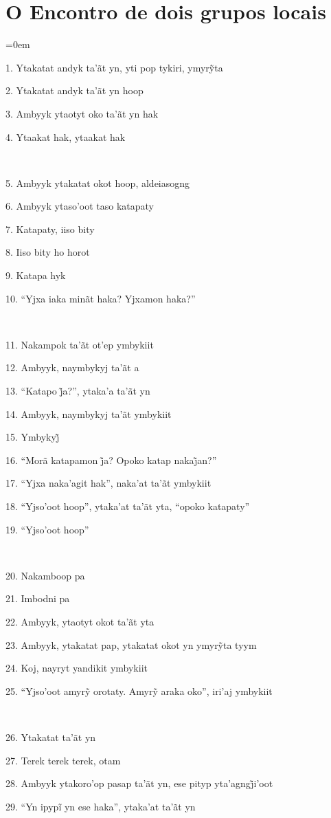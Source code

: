\chapter*{O Encontro de dois grupos locais}\parindent=0em

1. Ytakatat andyk ta’ãt yn, yti pop tykiri, ymyrỹta

2. Ytakatat andyk ta'ãt yn hoop

3. Ambyyk ytaotyt oko ta'ãt yn hak

4. Ytaakat hak, ytaakat hak

~

5. Ambyyk ytakatat okot hoop, aldeiasogng

6. Ambyyk ytaso'oot taso katapaty

7. Katapaty, iiso bity

8. Iiso bity ho horot

9. Katapa hyk

10. ``Yjxa iaka minãt haka? Yjxamon haka?''

~

11. Nakampok ta'ãt ot'ep ymbykiit

12. Ambyyk, naymbykyj ta'ãt a

13. “Katapo j̃a?”, ytaka’a ta’ãt yn

14. Ambyyk, naymbykyj ta'ãt ymbykiit

15. Ymbykyj̃

16. “Morã katapamon j̃a? Opoko katap nakaj̃an?”

17. ``Yjxa naka'agit hak'', naka'at ta'ãt ymbykiit

18. ``Yjso'oot hoop'', ytaka'at ta'ãt yta, ``opoko katapaty''

19. ``Yjso'oot hoop''

~

20. Nakamboop pa

21. Imbodni pa

22. Ambyyk, ytaotyt okot ta'ãt yta

23. Ambyyk, ytakatat pap, ytakatat okot yn ymyrỹta tyym

24. Koj, nayryt yandikit ymbykiit

25. “Yjso’oot amyrỹ orotaty. Amyrỹ araka oko”, iri’aj ymbykiit

~

26. Ytakatat ta'ãt yn

27. Terek terek terek, otam

28. Ambyyk ytakoro’op pasap ta’ãt yn, ese pityp yta’agngj̃i’oot

29. “Yn ipypĩ yn ese haka”, ytaka’at ta’ãt yn

